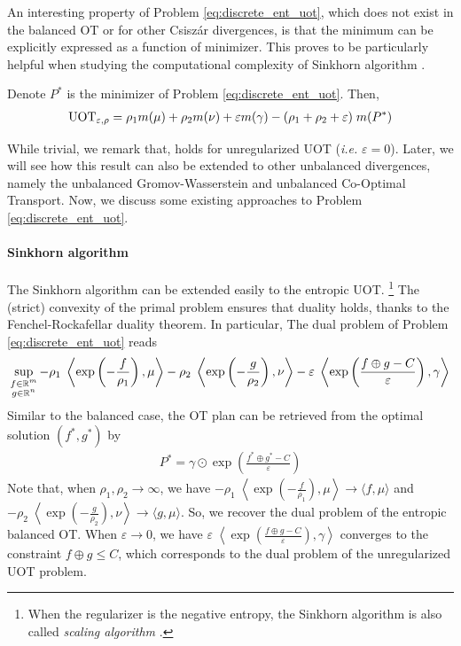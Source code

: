 An interesting property of Problem \ref{eq:discrete_ent_uot}, which does not exist in the
balanced OT or for other Csiszár divergences,
is that the minimum can be explicitly expressed as a function of minimizer.
This proves to be particularly helpful when studying the computational complexity of
Sinkhorn algorithm \citep{Khiem20}.
\begin{lemma}
  \label{eq:uot_minimizer}
Denote $P^*$ is the minimizer of Problem \ref{eq:discrete_ent_uot}. Then,
\begin{align*}
  \text{UOT}_{\varepsilon, \rho} = \rho_1 m(\mu) + \rho_2 m(\nu) + \varepsilon m(\gamma)
  - (\rho_1 + \rho_2 + \varepsilon) \; m(P^*)
\end{align*}
\end{lemma}
While trivial, we remark that,  holds for unregularized UOT
(\textit{i.e.} $\varepsilon = 0$). Later, we will see how this result can also be extended
to other unbalanced divergences, namely the unbalanced Gromov-Wasserstein and
unbalanced Co-Optimal Transport.
Now, we discuss some existing approaches to Problem \ref{eq:discrete_ent_uot}.

\paragraph{Sinkhorn algorithm} The Sinkhorn algorithm can be extended easily to the entropic UOT.
\footnote{When the regularizer is the negative entropy, the Sinkhorn algorithm is also called
\textit{scaling algorithm} \citep{Chizat18a}.} The (strict) convexity of the primal problem ensures
that duality holds, thanks to the Fenchel-Rockafellar duality theorem. In particular,
The dual problem of Problem \ref{eq:discrete_ent_uot} reads
\begin{align}
  \label{eq:dual_uot}
  \sup_{\substack{f \in \mathbb R^m \\ g \in \mathbb R^n}}
  -\rho_1 \; \left\langle \exp \left( - \frac{f}{\rho_1}\right), \mu \right\rangle
  -\rho_2 \; \left\langle \exp \left( - \frac{g}{\rho_2} \right), \nu \right\rangle
  - \varepsilon \; \left\langle \exp \left( \frac{f \oplus g - C}{\varepsilon} \right), \gamma \right\rangle
\end{align}
Similar to the balanced case, the OT plan can be retrieved from the optimal solution $(f^*, g^*)$ by
\begin{align*}
  P^* = \gamma \odot \exp \left( \frac{f^* \oplus g^* - C}{\varepsilon} \right)
\end{align*}
Note that, when $\rho_1, \rho_2 \to \infty$, we have
$-\rho_1 \; \left\langle \exp \left( - \frac{f}{\rho_1}\right), \mu \right\rangle \to
\langle f, \mu \rangle$ and
$-\rho_2 \; \left\langle \exp \left( - \frac{g}{\rho_2} \right), \nu \right\rangle \to \langle g, \mu \rangle$.
So, we recover the dual problem of the entropic balanced OT.
When $\varepsilon \to 0$, we have
$\varepsilon \; \left\langle \exp \left( \frac{f \oplus g - C}{\varepsilon} \right), \gamma \right\rangle$
converges to the constraint $f \oplus g \leq C$, which corresponds to the dual problem of the
unregularized UOT problem.

